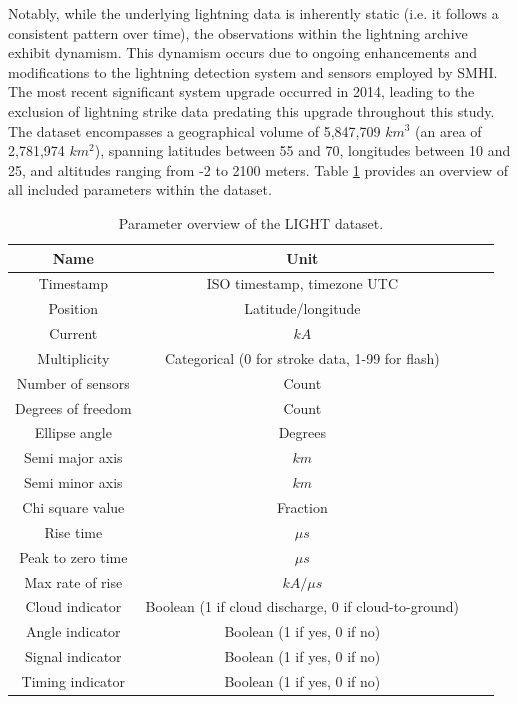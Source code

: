 Notably, while the underlying lightning data is inherently static (i.e. it follows a consistent pattern over time), the observations within the lightning archive exhibit dynamism. This dynamism occurs due to ongoing enhancements and modifications to the lightning detection system and sensors employed by SMHI. The most recent significant system upgrade occurred in 2014, leading to the exclusion of lightning strike data predating this upgrade throughout this study. The dataset encompasses a geographical volume of 5,847,709 $km^3$ (an area of 2,781,974 $km^2$), spanning latitudes between 55 and 70, longitudes between 10 and 25, and altitudes ranging from -2 to 2100 meters. Table \ref{tab:light} provides an overview of all included parameters within the dataset.

\begin{table}[h]
	\centering
	\begin{tabular}{|c|c|c|c|}
		\hline
		\textbf{Name} & \textbf{Unit} \\
		\hline \hline
		Timestamp & ISO timestamp, timezone UTC\\
		\hline
		Position & Latitude/longitude \\
		\hline
		Current & $kA$ \\
		\hline
		Multiplicity & Categorical (0 for stroke data, 1-99 for flash) \\
		\hline
		Number of sensors & Count \\
		\hline
		Degrees of freedom & Count \\
		\hline
		Ellipse angle & Degrees \\
		\hline
		Semi major axis & $km$ \\
		\hline
		Semi minor axis & $km$ \\
		\hline
		Chi square value & Fraction \\
		\hline
		Rise time & $\mu s$ \\
		\hline
		Peak to zero time & $\mu s$ \\
		\hline
		Max rate of rise & $kA / \mu s$ \\
		\hline
		Cloud indicator & Boolean (1 if cloud discharge, 0 if cloud-to-ground) \\
		\hline
		Angle indicator & Boolean (1 if yes, 0 if no) \\
		\hline
		Signal indicator & Boolean (1 if yes, 0 if no) \\
		\hline
		Timing indicator & Boolean (1 if yes, 0 if no) \\
		\hline
	\end{tabular}
	\caption{Parameter overview of the LIGHT dataset.}
	\label{tab:light}
\end{table}

